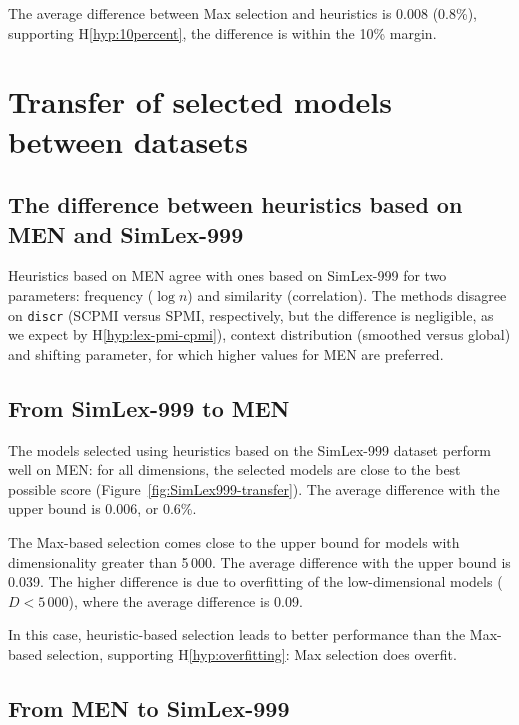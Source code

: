 The average difference between Max selection and heuristics is 0.008 (0.8\%), supporting H\ref{hyp:10percent}, the difference is within the 10\% margin.


\section{Transfer of selected models between datasets}
\label{sec:select-model-transf}

\subsection{The difference between heuristics based on MEN and SimLex-999}

Heuristics based on MEN agree with ones based on SimLex-999 for two parameters: frequency ($\log n$) and similarity (correlation). The methods disagree on \texttt{discr} (SCPMI versus SPMI, respectively, but the difference is negligible, as we expect by H\ref{hyp:lex-pmi-cpmi}), context distribution (smoothed versus global) and shifting parameter, for which higher values for MEN are preferred.

\subsection{From SimLex-999 to MEN}
\label{sec:simlex-men}



The models selected using heuristics based on the SimLex-999 dataset perform well on MEN: for all dimensions, the selected models are close to the best possible score (Figure~\ref{fig:SimLex999-transfer}). The average difference with the upper bound is 0.006, or 0.6\%.

The Max-based selection comes close to the upper bound for models with dimensionality greater than 5\,000. The average difference with the upper bound is 0.039. The higher difference is due to overfitting of the low-dimensional models ($D < 5\,000$), where the average difference is 0.09.

In this case, heuristic-based selection leads to better performance than the Max-based selection, supporting H\ref{hyp:overfitting}: Max selection does overfit.

\subsection{From MEN to SimLex-999}

